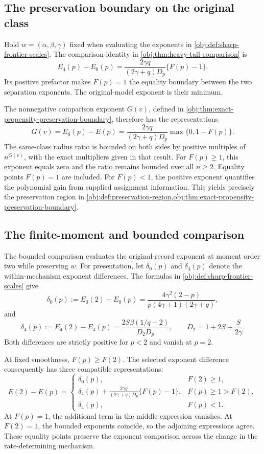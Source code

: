 \subsection{The preservation boundary on the original class}

Hold \(w=(\alpha,\beta,\gamma)\) fixed when evaluating the exponents in \cref{obj:def:sharp-frontier-scales}. The comparison identity in \cref{obj:thm:heavy-tail-comparison} is
\[
E_4(p)-E_0(p)
=
\frac{2\gamma q}{(2\gamma+q)D_p}\{F(p)-1\}.
\]
Its positive prefactor makes \(F(p)=1\) the equality boundary between the two separation exponents. The original-model exponent is their minimum.

The nonnegative comparison exponent \(G(v)\), defined in \cref{obj:thm:exact-propensity-preservation-boundary}, therefore has the representations
\[
G(v)=E_0(p)-E(p)
=
\frac{2\gamma q}{(2\gamma+q)D_p}
\max\{0,1-F(p)\}.
\]
The same-class radius ratio is bounded on both sides by positive multiples of \(n^{G(v)}\), with the exact multipliers given in that result. For \(F(p)\ge1\), this exponent equals zero and the ratio remains bounded over all \(n\ge2\). Equality points \(F(p)=1\) are included. For \(F(p)<1\), the positive exponent quantifies the polynomial gain from supplied assignment information. This yields precisely the preservation region in \cref{obj:def:preservation-region,obj:thm:exact-propensity-preservation-boundary}.

\subsection{The finite-moment and bounded comparison}

The bounded comparison evaluates the original-record exponent at moment order two while preserving \(w\). For presentation, let \(\delta_0(p)\) and \(\delta_4(p)\) denote the within-mechanism exponent differences. The formulas in \cref{obj:def:sharp-frontier-scales} give
\[
\delta_0(p)
:=E_0(2)-E_0(p)
=
\frac{4\gamma^2(2-p)}
{p(4\gamma+1)(2\gamma+q)},
\]
and
\[
\delta_4(p)
:=E_4(2)-E_4(p)
=
\frac{2S\beta(1/q-2)}{D_2D_p},
\qquad
D_2=1+2S+\frac{S}{2\gamma}.
\]
Both differences are strictly positive for \(p<2\) and vanish at \(p=2\).

At fixed smoothness, \(F(p)\ge F(2)\). The selected exponent difference consequently has three compatible representations:
\[
E(2)-E(p)=
\begin{cases}
\delta_0(p), & F(2)\ge1,\\[3pt]
\displaystyle
\delta_4(p)+
\frac{2\gamma q}{(2\gamma+q)D_p}\{F(p)-1\},
& F(p)\ge1>F(2),\\[8pt]
\delta_4(p), & F(p)<1.
\end{cases}
\]
At \(F(p)=1\), the additional term in the middle expression vanishes. At \(F(2)=1\), the bounded exponents coincide, so the adjoining expressions agree. These equality points preserve the exponent comparison across the change in the rate-determining mechanism.

